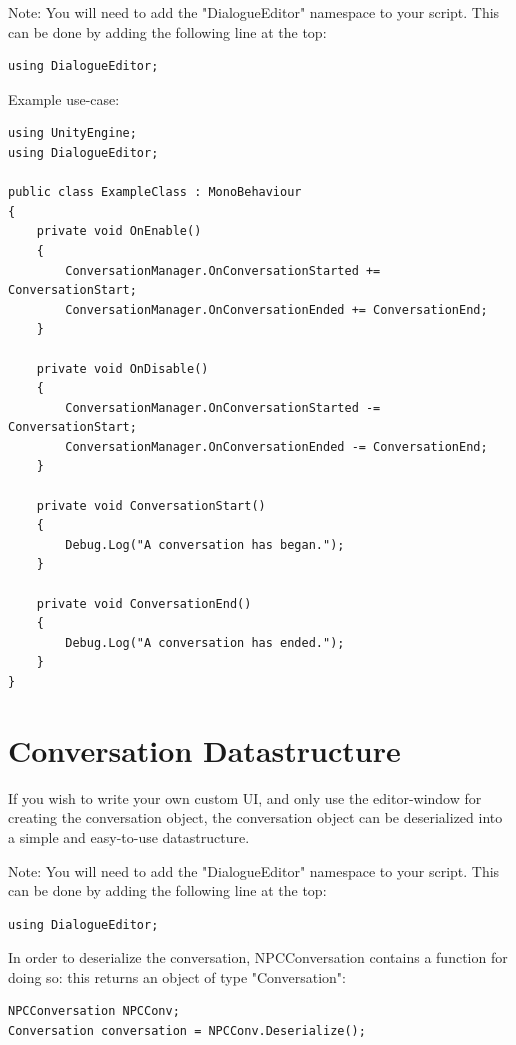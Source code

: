 \documentclass[a4paper,12pt]{article}
\begin{document}
Note: You will need to add the "DialogueEditor" namespace to your script. This can be done by adding the following line at the top:
\bigskip

\begin{lstlisting}
using DialogueEditor;
\end{lstlisting}
\bigskip

Example use-case:
\bigskip

\begin{lstlisting}
using UnityEngine;
using DialogueEditor;

public class ExampleClass : MonoBehaviour
{
	private void OnEnable()
	{
		ConversationManager.OnConversationStarted += ConversationStart;
		ConversationManager.OnConversationEnded += ConversationEnd;
	}
	
	private void OnDisable()
	{
		ConversationManager.OnConversationStarted -= ConversationStart;
		ConversationManager.OnConversationEnded -= ConversationEnd;
	}
	
	private void ConversationStart()
	{
		Debug.Log("A conversation has began.");
	}
	
	private void ConversationEnd()
	{
		Debug.Log("A conversation has ended.");
	}
}
\end{lstlisting}

\newpage

\section{Conversation Datastructure}
\hypertarget{_datastructure}{}

If you wish to write your own custom UI, and only use the editor-window for creating the conversation object, the conversation object can be deserialized into a simple and easy-to-use datastructure.

Note: You will need to add the "DialogueEditor" namespace to your script. This can be done by adding the following line at the top:
\bigskip

\begin{lstlisting}
using DialogueEditor;
\end{lstlisting}
\bigskip

In order to deserialize the conversation, NPCConversation contains a function for doing so: this returns an object of type "Conversation":
\bigskip

\begin{lstlisting}
NPCConversation NPCConv;
Conversation conversation = NPCConv.Deserialize();
\end{lstlisting}
\bigskip
\end{document}
